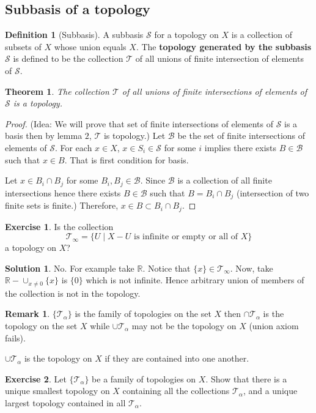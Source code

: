 \documentclass[12pt,reqno]{amsart}
\theoremstyle{plain}
\newtheorem{thm}{Theorem}
\theoremstyle{definition}
\newtheorem{defn}{Definition}
\newtheorem{exer}{Exercise}
\newtheorem{rem}{Remark}
\newtheorem*{sol*}{Solution}
\newcommand{\bb}[1]{\mathbb{#1}}
\newcommand{\cal}[1]{\mathcal{#1}}
\begin{document}
\subsection{Subbasis of a topology}
\begin{defn}[Subbasis]
    A subbasis $\cal{S}$ for a topology on $X$ is a collection of subsets of $X$ whose union equals $X$. The {\bf topology generated by the subbasis $\cal S$} is defined to be the collection $\cal T$ of all unions of finite intersection of elements of $\cal S$. 
\end{defn}
\begin{thm}
    The collection $\cal T$ of all unions of finite intersections of elements of $\cal S$ is a topology.
\end{thm}
\begin{proof} (Idea: We will prove that set of finite intersections of elements of $\cal S$ is a basis then by lemma $2$, $\cal T$ is topology.)
    Let $\cal B$ be the set of finite intersections of elements of $\cal S$. For each $x \in X$, $x \in S_i \in \cal S$ for some $i$ implies there exists $B \in \cal B$ such that $x \in B$. That is first condition for basis. 
    \par Let $x \in B_i \cap B_j$ for some $B_i,B_j \in \cal B$. Since $\cal B$ is a collection of all finite intersections hence there exists $B \in \cal B$ such that $B = B_i \cap B_j$ (intersection of two finite sets is finite.) Therefore, $x \in B \subset B_i \cap B_j$.
\end{proof}
\begin{exer}
    Is the collection $$ \cal T_{\infty} = \{U \mid X - U \text{ is infinite or empty or all of } X\}$$ a topology on $X$?
\end{exer}
\begin{sol*}
    No. For example take $\bb R$. Notice that $\{x\} \in \cal T_{\infty}$. Now, take $\bb R - \cup_{x \neq 0}\{x\}$ is $\{0\}$ which is not infinite. Hence arbitrary union of members of the collection is not in the topology.
\end{sol*}
\begin{rem}
    $\{\cal T_{\alpha}\}$ is the family of topologies on the set $X$ then $\cap \cal T_{\alpha}$ is the topology on the set $X$ while $\cup \cal T_{\alpha}$ may not be the topology on $X$ (union axiom fails). 
    \par $\cup \cal T_{\alpha}$ is the topology on $X$ if they are contained into one another.
\end{rem}
\begin{exer}
    Let $\{\cal T_{\alpha}\}$ be a family of topologies on $X$. Show that there is a unique smallest topology on $X$ containing all the collections $\cal T_{\alpha}$, and a unique largest topology contained in all $\cal T_\alpha$.
\end{exer}
\end{document}

